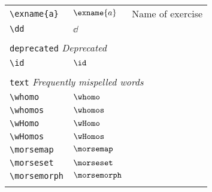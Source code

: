 \begin{longtable}{lll}
  {\color[rgb]{0.5,0.5,0.5}\texttt{\textbackslash exname\{a\}}}                                             & $\exname{a}$               & Name of exercise\\
  {\color[rgb]{0.5,0.5,0.5}\texttt{\textbackslash dd}}                                                      & $\dd$                      &                                                         \\
  &                            &                                                         \\
  \multicolumn{3}{l}{{\color[rgb]{0.5,0.5,0.5}\texttt{deprecated}} \emph{Deprecated}}
  \\
  \hline
  \hline
  {\color[rgb]{0.5,0.5,0.5}\texttt{\textbackslash id}}                                                      & $\id$                      &                                                         \\
  &                            &                                                         \\
  \multicolumn{3}{l}{{\color[rgb]{0.5,0.5,0.5}\texttt{text}} \emph{Frequently mispelled words}}
  \\
  \hline
  \hline
  {\color[rgb]{0.5,0.5,0.5}\texttt{\textbackslash whomo}}                                                   & $\whomo$                   & \\
  {\color[rgb]{0.5,0.5,0.5}\texttt{\textbackslash whomos}}                                                  & $\whomos$                  & \\
  {\color[rgb]{0.5,0.5,0.5}\texttt{\textbackslash wHomo}}                                                   & $\wHomo$                   & \\
  {\color[rgb]{0.5,0.5,0.5}\texttt{\textbackslash wHomos}}                                                  & $\wHomos$                  & \\
  {\color[rgb]{0.5,0.5,0.5}\texttt{\textbackslash morsemap}}                                                & $\morsemap$                & \\
  {\color[rgb]{0.5,0.5,0.5}\texttt{\textbackslash morseset}}                                                & $\morseset$                & \\
  {\color[rgb]{0.5,0.5,0.5}\texttt{\textbackslash morsemorph}}                                              & $\morsemorph$              &                                                         \\
  &                            &                                                         \\

\end{longtable}
